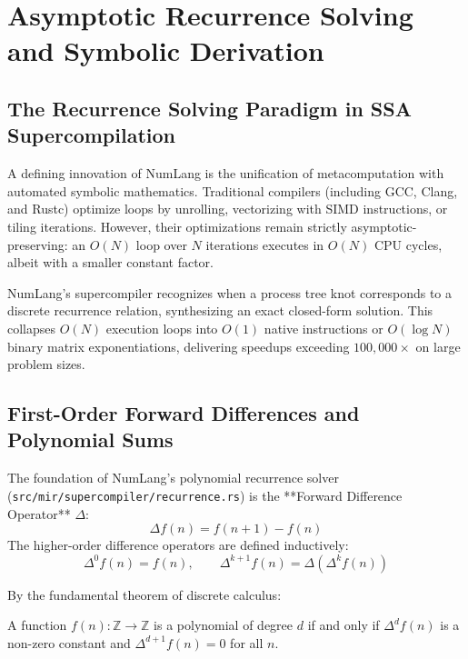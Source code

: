 \chapter{Asymptotic Recurrence Solving and Symbolic Derivation}
\label{chap:recurrences}

\section{The Recurrence Solving Paradigm in SSA Supercompilation}
\label{sec:rec:paradigm}

A defining innovation of NumLang is the unification of metacomputation with automated symbolic mathematics. Traditional compilers (including GCC, Clang, and Rustc) optimize loops by unrolling, vectorizing with SIMD instructions, or tiling iterations. However, their optimizations remain strictly asymptotic-preserving: an $O(N)$ loop over $N$ iterations executes in $O(N)$ CPU cycles, albeit with a smaller constant factor.

NumLang's supercompiler recognizes when a process tree knot corresponds to a discrete recurrence relation, synthesizing an exact closed-form solution. This collapses $O(N)$ execution loops into $O(1)$ native instructions or $O(\log N)$ binary matrix exponentiations, delivering speedups exceeding $100,000\times$ on large problem sizes.

\section{First-Order Forward Differences and Polynomial Sums}
\label{sec:rec:forward_diff}

The foundation of NumLang's polynomial recurrence solver (\texttt{src/mir/supercompiler/recurrence.rs}) is the **Forward Difference Operator** $\Delta$:
\begin{equation}
\Delta f(n) = f(n+1) - f(n)
\end{equation}
The higher-order difference operators are defined inductively:
\begin{equation}
\Delta^0 f(n) = f(n), \qquad \Delta^{k+1} f(n) = \Delta (\Delta^k f(n))
\end{equation}

By the fundamental theorem of discrete calculus:
\begin{theorem}
A function $f(n) : \mathbb{Z} \to \mathbb{Z}$ is a polynomial of degree $d$ if and only if $\Delta^d f(n)$ is a non-zero constant and $\Delta^{d+1} f(n) = 0$ for all $n$.
\end{theorem}

